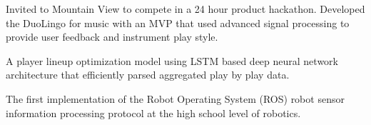 
{%
	Invited to Mountain View to compete in a 24 hour product hackathon. Developed the DuoLingo for music with an MVP that used advanced signal processing to provide user feedback and instrument play style.
}

\vspace{0.5em}

{%
	A player lineup optimization model using LSTM based deep neural network architecture that efficiently parsed aggregated play by play data.
}



\vspace{0.5em}

{%
	The first implementation of the Robot Operating System (ROS) robot sensor information processing protocol at the high school level of robotics.
}









